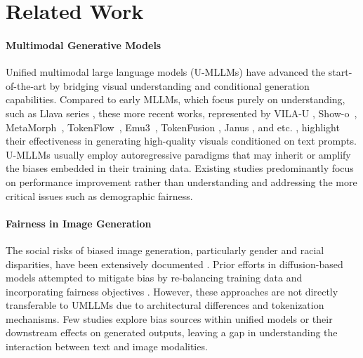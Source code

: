 \section{Related Work}

\paragraph{Multimodal Generative Models}

Unified multimodal large language models (U-MLLMs) have advanced the start-of-the-art by bridging visual understanding and conditional generation capabilities. 
Compared to early MLLMs, which focus purely on understanding, such as Llava series \cite{liu2024visual,liu2023improvedllava}, these more recent works, represented by VILA-U \cite{wu2024vila}, Show-o~\cite{xie2024showo}, MetaMorph~\cite{tong2024metamorphmultimodalunderstandinggeneration}, TokenFlow~\cite{qu2024tokenflow}, Emu3~\cite{wang2024emu3}, TokenFusion \cite{zhou2024transfusion}, Janus \cite{wu2024janus,ma2024janusflow}, and etc. \cite{bachmann20244m,le2024diffusiongenerate,li2024dual}, highlight their effectiveness in generating high-quality visuals conditioned on text prompts.
U-MLLMs usually employ autoregressive paradigms that may inherit or amplify the biases embedded in their training data.
Existing studies predominantly focus on performance improvement rather than understanding and addressing the more critical issues such as demographic fairness. 


\paragraph{Fairness in Image Generation}

The social risks of biased image generation, particularly gender and racial disparities, have been extensively documented \cite{kotek2023gender,li2024culturellm,li2024culturepark}. 
Prior efforts in diffusion-based models attempted to mitigate bias by re-balancing training data and incorporating fairness objectives \cite{kim2024training}. 
However, these approaches are not directly transferable to UMLLMs due to architectural differences and tokenization mechanisms. 
Few studies explore bias sources within unified models or their downstream effects on generated outputs, leaving a gap in understanding the interaction between text and image modalities. 

